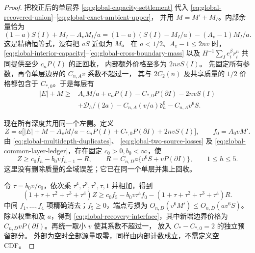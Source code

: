 \begin{proof}
把校正后的单层界 \eqref{eq:global-capacity-settlement} 代入
\eqref{eq:global-recovered-union}--\eqref{eq:global-exact-ambient-upper}，
并用 \(M=M'+M_I\)。内部余量恰为
\begin{equation}\label{eq:global-exact-interior-identity}
 (1-a)S(I)+M_I-A_vM_I/a
 =(1-a)(S(I)-M_I/a)-(A_v-1)M_I/a.
\end{equation}
这是精确恒等式，没有把 \(aS\) 近似为 \(M\)。
在 \(a<1/2\)、\(A_v-1\le2nv\) 时，
\eqref{eq:global-interior-capacity}--\eqref{eq:global-cross-boundary-mass}
以及 \(H^{-1}\sum_I e_i^\beta r_i^n\) 共同提供至少 \(c_nP(I)\) 的正回收，
内部额外价格至多为 \(2nvS(I)\)。
先固定所有参数，再令单层边界的 \(C_{n,A}v\) 系数不超过一，
其与 \(2C_2(n)\) 及共享质量的 \(1/2\) 价格都包含于 \(C_{*,0}\)。于是每层有
\begin{equation}\label{eq:global-common-layer-ledger}
 \begin{aligned}
 |E|+M\ge{}&A_vM/a+c_nP(I)-C_{*,0}P(\partial I)-2nvS(I)\\
 &+\mathcal D_h/(2a)-C_{n,A}(v/a)\mathfrak d_h^0-C_{n,A}v^6S.
 \end{aligned}
\end{equation}

现在所有深度共用同一个左侧。定义
\[
 Z=a\big[|E|+M-A_vM/a-c_nP(I)
              +C_{*,0}P(\partial I)+2nvS(I)\big],\qquad f_0=A_0vM'.
\]
由 \eqref{eq:global-multidepth-duplicates}、
\eqref{eq:global-two-source-losses} 及
\eqref{eq:global-common-layer-ledger}，存在固定 \(c_0>0,b_0<\infty\)，使
\begin{equation}\label{eq:global-multidepth-recursion}
 Z\ge c_0f_h-b_0vf_{h-1}-R,\qquad
 R=C_{n,D}a\{v^6S+vP(\partial I)\},\qquad 1\le h\le5.
\end{equation}
这里没有删除质量的全域误差；它已在同一个单层并集上回收。

令 \(\tau=b_0v/c_0\)，依次乘 \(\tau^4,\tau^3,\tau^2,\tau,1\) 并相加，得到
\begin{equation}\label{eq:global-multidepth-telescope}
 (1+\tau+\tau^2+\tau^3+\tau^4)Z
 \ge c_0f_5-b_0v\tau^4f_0-(1+\tau+\tau^2+\tau^3+\tau^4)R.
\end{equation}
中间 \(f_1,\ldots,f_4\) 项精确消去；\(f_5\ge0\)，端点亏损为
\(O_{n,D}(v^6M')\le O_{n,D}(av^6S)\)。除以权重和及 \(a\)，得到
\eqref{eq:global-recovery-interface}，其中新增边界价格为
\(C_{n,D}vP(\partial I)\)。再统一取小 \(v\) 使其系数不超过一，
放入 \(C_*-C_{*,0}=2\) 的独立预留部分。
外部为空时全部源量取零，同样由内部计数成立，不需定义空 CDF。
\end{proof}

